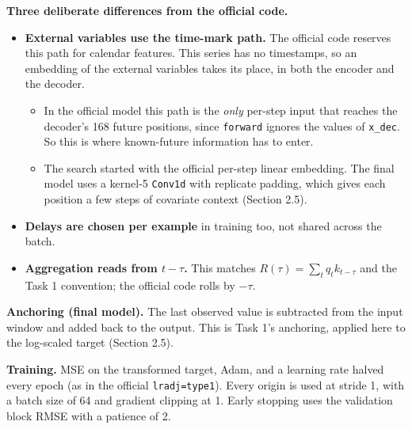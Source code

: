 \textbf{Three deliberate differences from the official code.}
\begin{itemize}
  \item \textbf{External variables use the time-mark path.} The official code reserves this path for calendar features. This series has no timestamps, so an embedding of the external variables takes its place, in both the encoder and the decoder.
    \begin{itemize}
      \item In the official model this path is the \emph{only} per-step input that reaches the decoder's 168 future positions, since \texttt{forward} ignores the values of \texttt{x\_dec}. So this is where known-future information has to enter.
      \item The search started with the official per-step linear embedding. The final model uses a kernel-5 \texttt{Conv1d} with replicate padding, which gives each position a few steps of covariate context (Section 2.5).
    \end{itemize}
  \item \textbf{Delays are chosen per example} in training too, not shared across the batch.
  \item \textbf{Aggregation reads from $t-\tau$.} This matches $R(\tau)=\sum_t q_t k_{t-\tau}$ and the Task 1 convention; the official code rolls by $-\tau$.
\end{itemize}

\textbf{Anchoring (final model).} The last observed value is subtracted from the input window and added back to the output. This is Task 1's anchoring, applied here to the log-scaled target (Section 2.5).

\textbf{Training.} MSE on the transformed target, Adam, and a learning rate halved every epoch (as in the official \texttt{lradj=type1}). Every origin is used at stride 1, with a batch size of 64 and gradient clipping at 1. Early stopping uses the validation block RMSE with a patience of 2.


